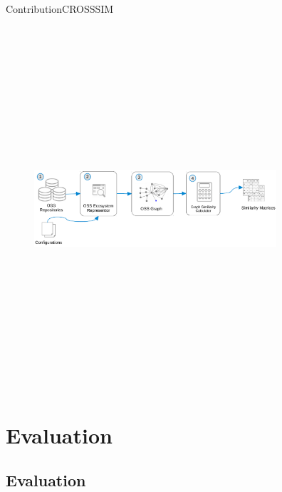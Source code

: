 \documentclass{beamer}
\begin{document}
\begin{frame}{Contribution}{CROSSSIM}
	\begin{figure}[!h]
	\includegraphics[width=9cm,height=13.5cm,keepaspectratio]{images/CrossSim.pdf}
	\centering
	\label{fig:CrossSim}
	\end{figure}
\end{frame}

\section{Evaluation}
\subsection{Evaluation}
\end{document}
